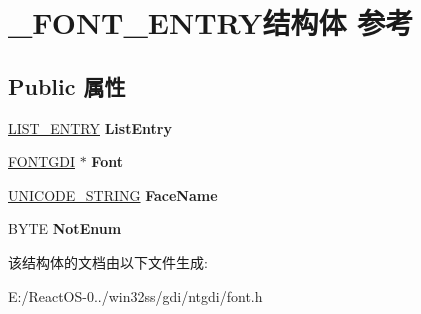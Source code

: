 \hypertarget{struct___f_o_n_t___e_n_t_r_y}{}\section{\+\_\+\+F\+O\+N\+T\+\_\+\+E\+N\+T\+R\+Y结构体 参考}
\label{struct___f_o_n_t___e_n_t_r_y}
\subsection*{Public 属性}
\begin{DoxyCompactItemize}
\item 
\mbox{\label{struct___f_o_n_t___e_n_t_r_y_af3d9a7d76de826e36e9937f29b1f30a9}} 
\hyperlink{struct___l_i_s_t___e_n_t_r_y}{L\+I\+S\+T\+\_\+\+E\+N\+T\+RY} {\bfseries List\+Entry}
\item 
\mbox{\label{struct___f_o_n_t___e_n_t_r_y_a286f1634a754ae6cf1a7012861f42db7}} 
\hyperlink{struct___f_o_n_t_g_d_i}{F\+O\+N\+T\+G\+DI} $\ast$ {\bfseries Font}
\item 
\mbox{\label{struct___f_o_n_t___e_n_t_r_y_a967e04576578e08e0347ed2e574fb5cf}} 
\hyperlink{struct___u_n_i_c_o_d_e___s_t_r_i_n_g}{U\+N\+I\+C\+O\+D\+E\+\_\+\+S\+T\+R\+I\+NG} {\bfseries Face\+Name}
\item 
\mbox{\label{struct___f_o_n_t___e_n_t_r_y_a36a2fa43bba616e8f341c4f32effc2ef}} 
B\+Y\+TE {\bfseries Not\+Enum}
\end{DoxyCompactItemize}


该结构体的文档由以下文件生成\+:\begin{DoxyCompactItemize}
\item 
E\+:/\+React\+O\+S-\/0../win32ss/gdi/ntgdi/font.\+h\end{DoxyCompactItemize}
